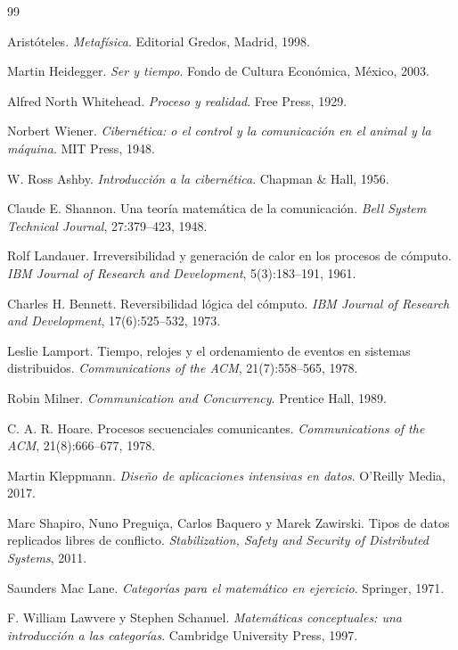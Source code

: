 \documentclass[12pt]{article}
\begin{document}
\newpage
\begin{thebibliography}{99}

Aristóteles.
\textit{Metafísica}.
Editorial Gredos, Madrid, 1998.

Martin Heidegger.
\textit{Ser y tiempo}.
Fondo de Cultura Económica, México, 2003.

Alfred North Whitehead.
\textit{Proceso y realidad}.
Free Press, 1929.

Norbert Wiener.
\textit{Cibernética: o el control y la comunicación en el animal y la máquina}.
MIT Press, 1948.

W. Ross Ashby.
\textit{Introducción a la cibernética}.
Chapman \& Hall, 1956.

Claude E. Shannon.
Una teoría matemática de la comunicación.
\textit{Bell System Technical Journal}, 27:379--423, 1948.

Rolf Landauer.
Irreversibilidad y generación de calor en los procesos de cómputo.
\textit{IBM Journal of Research and Development}, 5(3):183--191, 1961.

Charles H. Bennett.
Reversibilidad lógica del cómputo.
\textit{IBM Journal of Research and Development}, 17(6):525--532, 1973.

Leslie Lamport.
Tiempo, relojes y el ordenamiento de eventos en sistemas distribuidos.
\textit{Communications of the ACM}, 21(7):558--565, 1978.

Robin Milner.
\textit{Communication and Concurrency}.
Prentice Hall, 1989.

C. A. R. Hoare.
Procesos secuenciales comunicantes.
\textit{Communications of the ACM}, 21(8):666--677, 1978.

Martin Kleppmann.
\textit{Diseño de aplicaciones intensivas en datos}.
O’Reilly Media, 2017.

Marc Shapiro, Nuno Preguiça, Carlos Baquero y Marek Zawirski.
Tipos de datos replicados libres de conflicto.
\textit{Stabilization, Safety and Security of Distributed Systems}, 2011.

Saunders Mac Lane.
\textit{Categorías para el matemático en ejercicio}.
Springer, 1971.

F. William Lawvere y Stephen Schanuel.
\textit{Matemáticas conceptuales: una introducción a las categorías}.
Cambridge University Press, 1997.


\end{thebibliography}
\end{document}
